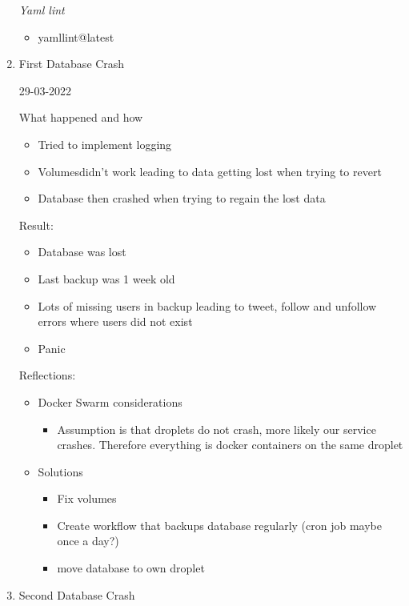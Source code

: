 \begin{enumerate}
    \textit{Yaml lint}
    \begin{itemize}
        \item yamllint@latest
    \end{itemize}
    \item First Database Crash 

    29-03-2022

    What happened and how
    \begin{itemize}
        \item Tried to implement logging
        \item Volumesdidn’t work leading to data getting lost when trying to revert
        \item Database then crashed when trying to regain the lost data
    \end{itemize}
   
    Result:
    \begin{itemize}
        \item Database was lost
        \item Last backup was 1 week old
        \item Lots of missing users in backup leading to tweet, follow and unfollow errors where users did not exist
        \item Panic
    \end{itemize}
    
    
    Reflections:
    \begin{itemize}
        \item Docker Swarm considerations
        \begin{itemize}
            \item Assumption is that droplets do not crash, more likely our service crashes. Therefore everything is docker containers on the same droplet
        \end{itemize}
        \item Solutions
        \begin{itemize}
            \item Fix volumes
            \item Create workflow that backups database regularly (cron job maybe once a day?)
            \item move database to own droplet
        \end{itemize}
    \end{itemize}
    
    \item Second Database Crash
    

\end{enumerate}

